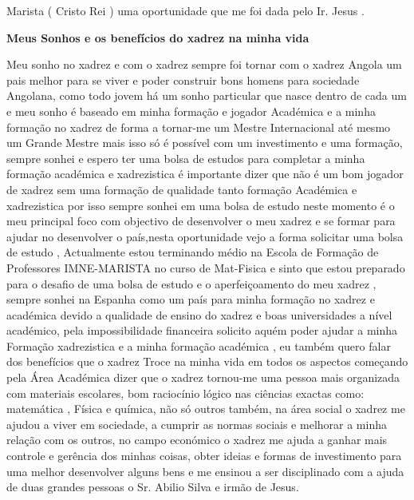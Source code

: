 \begin{multicols}{2}
Marista ( Cristo Rei ) uma oportunidade que me foi dada pelo Ir. Jesus .

\begin{center}
\end{center}

\textbf{Meus Sonhos e os benefícios do xadrez na minha vida}

Meu sonho no xadrez e com o xadrez sempre foi tornar com o xadrez  Angola um pais melhor para se viver e poder construir bons homens para sociedade Angolana, como todo  jovem há um sonho particular que nasce dentro de cada um e meu sonho é baseado em minha formação e jogador Académica e a minha formação no xadrez de forma a tornar-me um Mestre Internacional até mesmo um Grande Mestre mais isso só é possível com um investimento e uma formação, sempre sonhei e espero ter uma bolsa de estudos para completar a minha formação académica e xadrezistica é importante  dizer  que não é um bom jogador de xadrez sem uma formação de qualidade tanto formação Académica e xadrezistica por isso sempre sonhei em uma bolsa de estudo neste momento é o meu principal foco com objectivo de desenvolver o meu xadrez e se formar para ajudar no desenvolver o país,nesta oportunidade vejo a forma solicitar uma bolsa de estudo , Actualmente estou terminando médio na Escola de Formação de Professores IMNE-MARISTA no curso de Mat-Fisica e sinto que estou preparado para o desafio de uma bolsa de estudo e o aperfeiçoamento do meu xadrez , sempre sonhei na Espanha como um país para minha formação no xadrez e académica devido a qualidade de ensino do xadrez e boas universidades a nível académico, pela impossibilidade financeira solicito aquém poder  ajudar a minha Formação xadrezistica e a minha formação académica , eu também quero falar dos benefícios que o xadrez Troce na minha vida em todos os aspectos começando pela Área  Académica dizer que o xadrez tornou-me uma pessoa mais organizada com materiais escolares, bom raciocínio lógico nas ciências exactas como: matemática , Física e química, não só outros também, na área social o xadrez me ajudou a viver em sociedade, a cumprir as normas sociais e melhorar a minha relação com os outros, no campo económico o xadrez me ajuda a ganhar mais controle e gerência dos minhas coisas, obter ideias e formas de investimento para uma melhor desenvolver alguns bens e me ensinou a ser disciplinado com a ajuda de duas grandes pessoas o Sr. Abilio Silva e irmão de Jesus.


\end{multicols}
